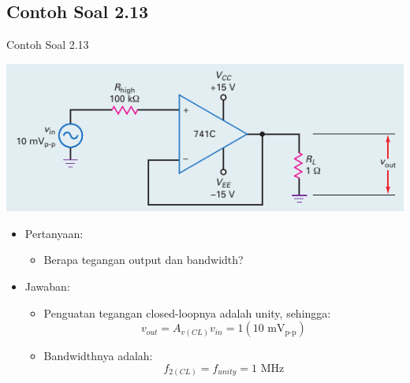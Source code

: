\subsection{Contoh Soal 2.13}
\begin{frame}{Contoh Soal 2.13}
	\begin{multicols}{2}
	\begin{center}
		\includegraphics[width=\linewidth]{gambar/fig-16.26a}
	\end{center}
	\columnbreak
	\begin{itemize}
		\item Pertanyaan:
		\begin{itemize}
			\item Berapa tegangan output dan bandwidth?
		\end{itemize}
		\item Jawaban:
		\begin{itemize}
			\item Penguatan tegangan closed-loopnya adalah unity, sehingga:
			\[ v_{out} = A_{v(CL)} v_{in} = 1(10 \text{ mV}_\text{p-p})\]
			\item Bandwidthnya adalah:
			\[ f_{2(CL)} = f_{unity} = 1 \text{ MHz} \]
		\end{itemize}
	\end{itemize}
\end{multicols}
\end{frame}


